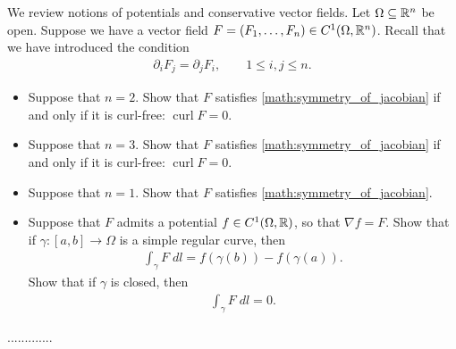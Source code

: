 \documentclass[11pt]{article}
\begin{document}
\begin{exercise}
    We review notions of potentials and conservative vector fields. Let $\Omega \subseteq \mathbb{R}^n$ be open.
    Suppose we have a vector field $F = (F_1,\dots,F_n) \in C^1(\Omega,\mathbb{R}^n)$.
	Recall that we have introduced the condition
    \begin{align}\label{math:symmetry_of_jacobian}
        \partial_i F_j = \partial_j F_i, \qquad 1 \leq i,j \leq n.
    \end{align}
    \begin{itemize}
     \item Suppose that $n=2$. Show that $F$ satisfies \eqref{math:symmetry_of_jacobian} if and only if it is curl-free: $\operatorname{curl} F = 0$.
     \item Suppose that $n=3$. Show that $F$ satisfies \eqref{math:symmetry_of_jacobian} if and only if it is curl-free: $\operatorname{curl} F = 0$.
     \item Suppose that $n=1$. Show that $F$ satisfies \eqref{math:symmetry_of_jacobian}.
     \item Suppose that $F$ admits a potential $f \in C^1(\Omega,\mathbb{R})$, so that $\nabla f = F$. 
     Show that if $\gamma : [a,b] \rightarrow \Omega$ is a simple regular curve, then 
     \begin{align}
        \int_\gamma F \;dl = f(\gamma(b)) - f(\gamma(a)).
     \end{align}
     Show that if $\gamma$ is closed, then 
     \begin{align}
        \int_\gamma F \;dl = 0.
     \end{align}
    \end{itemize}
\end{exercise}
\begin{solution}
    .............
\end{solution}
\end{document}
